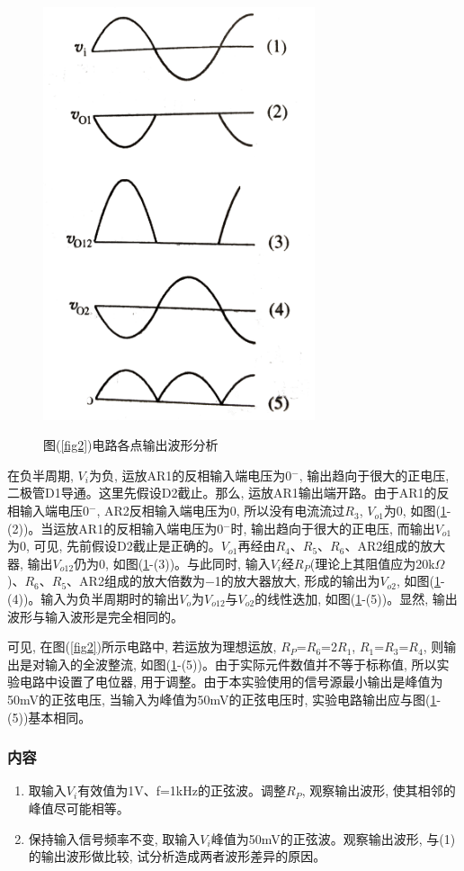 \documentclass[a4paper]{article}
\begin{document}
\begin{figure}[!h]
\centering
\includegraphics[width=8cm]{fig/fig3.jpg}\\
\caption{图(\ref{fig2})电路各点输出波形分析}\label{fig3}
\end{figure}

在负半周期, $V_i$为负, 运放AR1的反相输入端电压为0$^{-}$, 输出趋向于很大的正电压, 二极管D1导通。这里先假设D2截止。那么, 运放AR1输出端开路。由于AR1的反相输入端电压0$^{-}$, AR2反相输入端电压为0, 所以没有电流流过$R_3$, $V_{o1}$为0, 如图(\ref{fig3}-(2))。当运放AR1的反相输入端电压为0$^{-}$时, 输出趋向于很大的正电压, 而输出$V_{o1}$为0, 可见, 先前假设D2截止是正确的。$V_{o1}$再经由$R_4$、$R_5$、$R_6$、AR2组成的放大器, 输出$V_{o12}$仍为0, 如图(\ref{fig3}-(3))。与此同时, 输入$V_i$经$R_P$(理论上其阻值应为20k$\Omega$)、$R_6$、$R_5$、AR2组成的放大倍数为$-$1的放大器放大, 形成的输出为$V_{o2}$, 如图(\ref{fig3}-(4))。输入为负半周期时的输出$V_o$为$V_{o12}$与$V_{o2}$的线性迭加, 如图(\ref{fig3}-(5))。显然, 输出波形与输入波形是完全相同的。

可见, 在图(\ref{fig2})所示电路中, 若运放为理想运放, $R_P$=$R_6$=2$R_1$, $R_1$=$R_3$=$R_4$, 则输出是对输入的全波整流, 如图(\ref{fig3}-(5))。由于实际元件数值并不等于标称值, 所以实验电路中设置了电位器, 用于调整。由于本实验使用的信号源最小输出是峰值为50mV的正弦电压, 当输入为峰值为50mV的正弦电压时, 实验电路输出应与图(\ref{fig3}-(5))基本相同。

\subsubsection{内容}
\begin{enumerate}
\item 取输入$V_i$有效值为1V、f=1kHz的正弦波。调整$R_P$, 观察输出波形, 使其相邻的峰值尽可能相等。
\item 保持输入信号频率不变, 取输入$V_i$峰值为50mV的正弦波。观察输出波形, 与(1)的输出波形做比较, 试分析造成两者波形差异的原因。
\end{enumerate}
\end{document}
